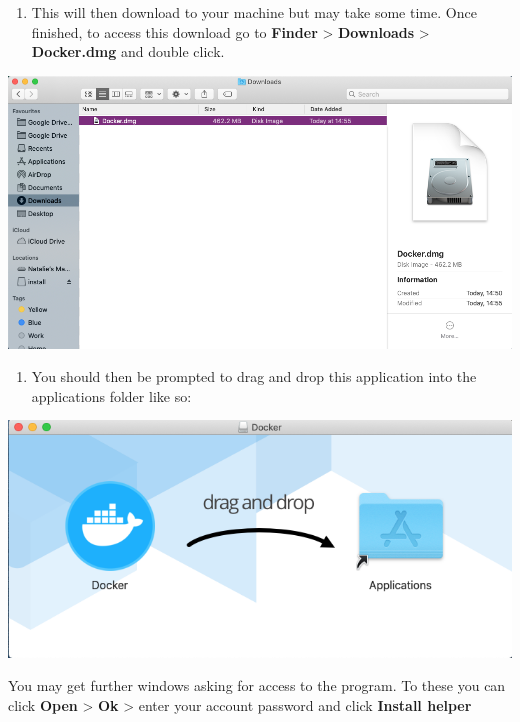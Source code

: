 \documentclass[
]{book}
\providecommand{\tightlist}{%
  \setlength{\itemsep}{0pt}\setlength{\parskip}{0pt}}
\begin{document}
\begin{enumerate}
\def\labelenumi{\arabic{enumi}.}
\setcounter{enumi}{2}
\tightlist
\item
  This will then download to your machine but may take some time. Once finished, to access this download go to \textbf{Finder} \textgreater{} \textbf{Downloads} \textgreater{} \textbf{Docker.dmg} and double click.
\end{enumerate}

\begin{center}\includegraphics[width=13.96in]{figs/chp1/Figure2} \end{center}

\begin{enumerate}
\def\labelenumi{\arabic{enumi}.}
\setcounter{enumi}{3}
\tightlist
\item
  You should then be prompted to drag and drop this application into the applications folder like so:
\end{enumerate}

\begin{center}\includegraphics[width=10in]{figs/chp1/Figure3} \end{center}

You may get further windows asking for access to the program. To these you can click \textbf{Open} \textgreater{} \textbf{Ok} \textgreater{} enter your account password and click \textbf{Install helper}
\end{document}
